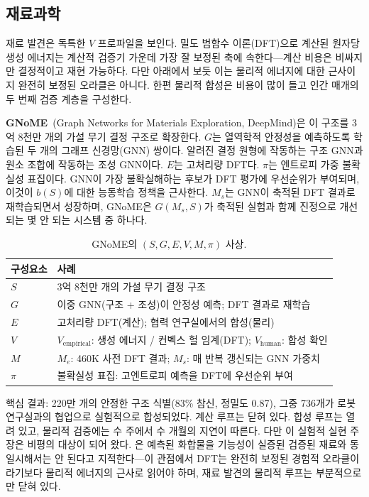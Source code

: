 \documentclass[11pt]{article}
\newcommand{\sgmvpi}{$(S, G, E, V, M, \pi)$}
\begin{document}
\subsection{재료과학}

재료 발견은 독특한 $V$ 프로파일을 보인다. 밀도 범함수 이론(DFT)으로 계산된 원자당 생성 에너지는 계산적 검증기 가운데 가장 잘 보정된 축에 속한다---계산 비용은 비싸지만 결정적이고 재현 가능하다. 다만 아래에서 보듯 이는 물리적 에너지에 대한 근사이지 완전히 보정된 오라클은 아니다. 한편 물리적 합성은 비용이 많이 들고 인간 매개의 두 번째 검증 계층을 구성한다.

\textbf{GNoME}~\citep{merchant2023gnome}(Graph Networks for Materials Exploration, DeepMind)은 이 구조를 3억 8천만 개의 가설 무기 결정 구조로 확장한다. $G$는 열역학적 안정성을 예측하도록 학습된 두 개의 그래프 신경망(GNN) 쌍이다. 알려진 결정 원형에 작동하는 구조 GNN과 원소 조합에 작동하는 조성 GNN이다. $E$는 고처리량 DFT다. $\pi$는 엔트로피 가중 불확실성 표집이다. GNN이 가장 불확실해하는 후보가 DFT 평가에 우선순위가 부여되며, 이것이 $b(S)$에 대한 능동학습 정책을 근사한다. $M_s$는 GNN이 축적된 DFT 결과로 재학습되면서 성장하며, GNoME은 $G(M_s, S)$가 축적된 실험과 함께 진정으로 개선되는 몇 안 되는 시스템 중 하나다.

\begin{table}[h]
\centering
\small
\begin{tabular}{@{}lp{9cm}@{}}
\toprule
구성요소 & 사례 \\
\midrule
$S$ & 3억 8천만 개의 가설 무기 결정 구조 \\
$G$ & 이중 GNN(구조 + 조성)이 안정성 예측; DFT 결과로 재학습 \\
$E$ & 고처리량 DFT(계산); 협력 연구실에서의 합성(물리) \\
$V$ & $V_\text{empirical}$: 생성 에너지 / 컨벡스 헐 임계(DFT); $V_\text{human}$: 합성 확인 \\
$M$ & $M_e$: 460K 사전 DFT 결과; $M_s$: 매 반복 갱신되는 GNN 가중치 \\
$\pi$ & 불확실성 표집: 고엔트로피 예측을 DFT에 우선순위 부여 \\
\bottomrule
\end{tabular}
\caption{GNoME의 \sgmvpi{} 사상.}
\end{table}

\noindent 핵심 결과: 220만 개의 안정한 구조 식별(83\% 참신, 정밀도 0.87), 그중 736개가 로봇 연구실과의 협업으로 실험적으로 합성되었다. 계산 루프는 닫혀 있다. 합성 루프는 열려 있고, 물리적 검증에는 수 주에서 수 개월의 지연이 따른다. 다만 이 실험적 실현 주장은 비평의 대상이 되어 왔다. \citet{cheetham2024gnome}은 예측된 화합물을 기능성이 실증된 검증된 재료와 동일시해서는 안 된다고 지적한다---이 관점에서 DFT는 완전히 보정된 경험적 오라클이라기보다 물리적 에너지의 근사로 읽어야 하며, 재료 발견의 물리적 루프는 부분적으로만 닫혀 있다.
\end{document}
